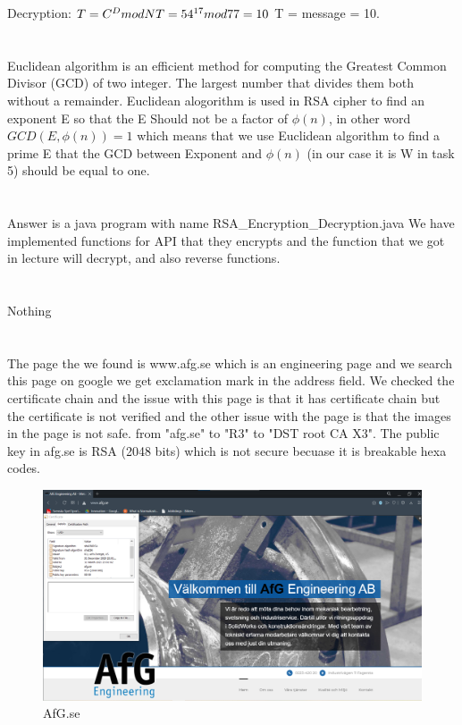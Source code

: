 \documentclass{article}
\begin{document}
            Decryption:\newline
        \begin{math}
            T = C ^ D mod N \newline 
            T = 54^{17} mod 77 = 10
        \end{math}\newline
        T = message = 10. 
    \section{}
    Euclidean algorithm is an efficient method for computing the Greatest Common Divisor (GCD) of two integer. The largest number that divides them both without a remainder.\newline
    Euclidean alogorithm is used in RSA cipher to find an exponent E so that the E Should not be a factor of $\phi(n)$, in other word $GCD(E,\phi(n)) = 1$ 
    which means that we use Euclidean algorithm to find a prime E that the GCD between Exponent and $\phi(n)$ (in our case it is W in task 5) should be equal to one.\cite{RSA}
    \section{}
    Answer is a java program with name RSA\_Encryption\_Decryption.java\newline
    We have implemented functions for API that they encrypts and the function that we got in lecture will decrypt, and also reverse functions.
    \section{}
    Nothing
    \section{}
    The page the we found is www.afg.se which is an engineering page and we search this page on google we
    get exclamation mark in the address field. We checked the certificate chain and the issue with this page is that it has certificate chain but the certificate is not verified and the other issue with the page is that the images in the page is not safe. from "afg.se" to "R3" to "DST root CA X3". 
    The public key in afg.se is RSA (2048 bits) which is not secure becuase it is breakable hexa codes.\cite{AFG}
    \begin{figure}
        \includegraphics[width=\linewidth]{afg.png}
        \caption{AfG.se}
        \label{fig:AfG}
    \end{figure}
\end{document}
